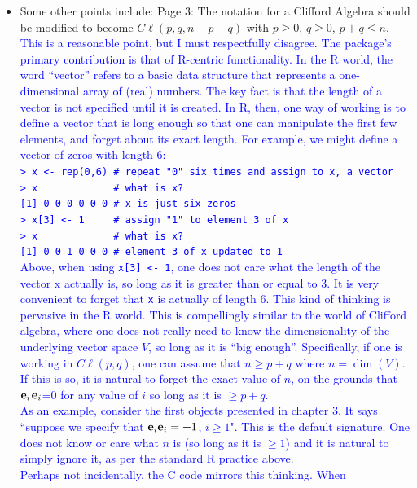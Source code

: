 \documentclass{article}
\newcommand{\cliff}[1]{\ensuremath{C\ell\left(#1\right)}}
\newcommand{\ei}[1]{\ensuremath{{\bf e}_{#1}}}
\begin{document}
\begin{itemize}
\item Some other points include: Page 3: The notation for a Clifford
  Algebra should be modified to become $\cliff{p,q,n-p-q}$ with $p\geq
  0$, $q\geq 0$, $p+q\leq n$.
\textcolor{blue}{This is a reasonable point, but I must respectfully
  disagree.  The package's primary contribution is that of R-centric
  functionality.  In the R world, the word ``vector'' refers to a
  basic data structure that represents a one-dimensional array of
  (real) numbers.  The key fact is that the length of a vector is not
  specified until it is created.  In R, then, one way of working is to
  define a vector that is long enough so that one can manipulate the
  first few elements, and forget about its exact length.  For example,
  we might define a vector of zeros with length 6:\\[20pt]
  {\tt > x <- rep(0,6)   \# repeat "0" six times and assign to x, a vector}\\
  {\tt > x\ \ \ \ \ \ \ \ \ \ \ \ \ \# what is x?}\\
  {\tt [1] 0 0 0 0 0 0\ \# x is just six zeros}\\
  {\tt > x[3] <- 1\ \ \ \ \ \# assign "1" to element 3 of x}\\
  {\tt > x\ \ \ \ \ \ \ \ \ \ \ \ \ \# what is x?}\\
  {\tt [1] 0 0 1 0 0 0\ \# element 3 of x updated to 1}\\[20pt]
Above, when using {\tt x[3] <- 1}, one does not care what the length
of the vector x actually is, so long as it is greater than or equal to
3.  It is very convenient to forget that {\tt x} is actually of length
6. This kind of thinking is pervasive in the R world.  This is
compellingly similar to the world of Clifford algebra, where one does
not really need to know the dimensionality of the underlying vector
space $V$, so long as it is ``big enough''.  Specifically, if one is
working in $\cliff{p,q}$, one can assume that $n\geq p+q$ where
$n=\dim(V)$.  If this is so, it is natural to forget the exact value of
$n$, on the grounds that \ei{i}\ei{i}=0 for any value of $i$ so long
as it is $\geq p+q$.\\
As an example, consider the first objects presented in chapter 3.  It
says ``suppose we specify that $\ei{i}\ei{i}=+1$, $i\geq 1$".  This is
the default signature.  One does not know or care what $n$ is (so long
as it is $\geq 1$) and it is natural to simply ignore it, as per
the standard R practice above.\\
Perhaps not incidentally, the C code mirrors this thinking.  When
}
\end{itemize}
\end{document}

